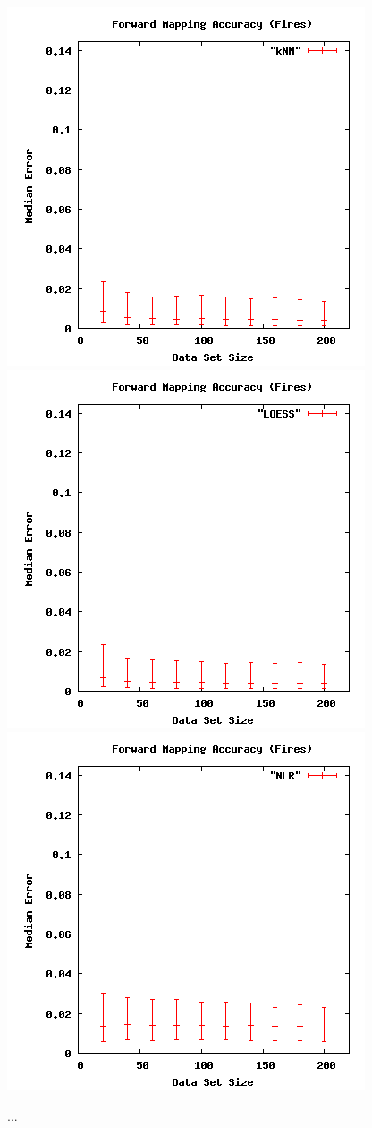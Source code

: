 \begin{figure}[ht]
\centering
\includegraphics[scale=.3333333]{images/results_fires/fmacc-kNN.png}
\includegraphics[scale=.3333333]{images/results_fires/fmacc-LOESS.png}
\includegraphics[scale=.3333333]{images/results_fires/fmacc-NLR.png}
\caption{...}
\label{fig:fmacc}
\end{figure}

